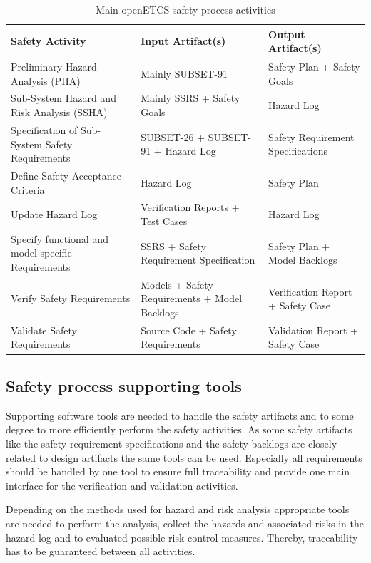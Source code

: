 \documentclass{template/openetcs_article}
\begin{document}
\begin{table}[htbp]
  \centering
  \caption{Main openETCS safety process activities}
    \begin{tabular}{p{6cm}|p{4cm}|p{4cm}} 
 \textbf{Safety Activity} & \textbf{Input Artifact(s)} & \textbf{Output Artifact(s)}  \\ \hline
 Preliminary Hazard Analysis (PHA) & Mainly SUBSET-91 & Safety Plan + Safety Goals \\ 
 Sub-System Hazard and Risk Analysis (SSHA) & Mainly SSRS + Safety Goals & Hazard Log \\ 
 Specification of Sub-System Safety Requirements & SUBSET-26 + SUBSET-91 + Hazard Log  & Safety Requirement Specifications \\ 
 Define Safety Acceptance Criteria & Hazard Log & Safety Plan  \\ 
 Update Hazard Log & Verification Reports + Test Cases & Hazard Log \\
 Specify functional and model specific Requirements & SSRS + Safety Requirement Specification & Safety Plan + Model Backlogs\\
 Verify Safety Requirements & Models + Safety Requirements + Model Backlogs & Verification Report + Safety Case \\
 Validate Safety Requirements & Source Code + Safety Requirements & Validation Report + Safety Case \\
 
\end{tabular}  
  \label{tab:openETCS-Safety-activities}%
\end{table}%

\subsection{Safety process supporting tools}

Supporting software tools are needed to handle the safety artifacts and to some degree to more efficiently perform the safety activities. As some safety artifacts like the safety requirement specifications and the safety backlogs are closely related to design artifacts the same tools can be used. Especially all requirements should be handled by one tool to ensure full traceability and provide one main interface for the verification and validation activities.

Depending on the methods used for hazard and risk analysis appropriate tools are needed to perform the analysis, collect the hazards and associated risks in the hazard log and to evaluated possible risk control measures. Thereby, traceability has to be guaranteed between all activities.
\end{document}
